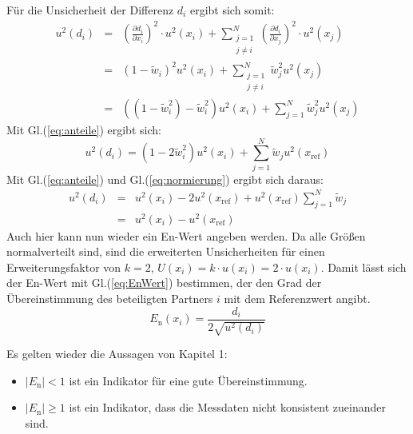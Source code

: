 \begin{itemize}
Für die Unsicherheit der Differenz $d_i$ ergibt sich somit:
\begin{eqnarray}
u^2(d_i) &=& \left( \frac{\partial d_i}{\partial x_i} \right)^2 \cdot u^2(x_i) +  \sum_{\substack{j=1 \\ j \neq i}}^{N}
\left( \frac{\partial d_i}{\partial x_j} \right)^2 \cdot u^2(x_j) \\
&=&  (1-\tilde w_i)^2 u^2(x_i) + \sum_{\substack{j=1 \\ j \neq i}}^{N} \tilde w_j^2 u^2( x_j) \\
&=& ((1-\tilde w_i^2)-\tilde w_i^2)u^2(x_i) + \sum_{j=1}^{N} \tilde w_j^2 u^2(x_j) 
\end{eqnarray}
Mit Gl.(\ref{eq:anteile}) ergibt sich:
\begin{equation}
u^2(d_i) = (1-2\tilde w_i^2)u^2(x_i) + \sum_{j=1}^{N} \tilde w_j u^2(x_\mathrm{ref}) 
\end{equation}
Mit Gl.(\ref{eq:anteile}) und Gl.(\ref{eq:normierung}) ergibt sich daraus:
\begin{eqnarray}
u^2(d_i) &=& u^2(x_i) - 2u^2(x_\mathrm{ref}) + u^2(x_\mathrm{ref}) \sum_{j=1}^{N}\tilde w_j  
\nonumber \\
  &=& u^2(x_i) -u^2(x_\mathrm{ref})
\end{eqnarray}
Auch hier kann nun wieder ein En-Wert angeben werden. Da alle Größen normalverteilt sind, sind die erweiterten Unsicherheiten für einen 
Erweiterungsfaktor von $k=2$, $U(x_i) = k \cdot u(x_i) =2 \cdot u(x_i)$. Damit lässt sich der En-Wert mit Gl.(\ref{eq:EnWert}) bestimmen, der den
Grad der Übereinstimmung des beteiligten Partners $i$ mit dem Referenzwert
angibt.
\begin{equation}
E_\mathrm{n}(x_i) = \frac{d_i}{2\sqrt{u^2(d_i)}}
\end{equation}
\end{itemize}

Es gelten wieder die Aussagen von Kapitel 1:
\begin{itemize}
	\item $|E_\mathrm{n}| < 1$ ist ein Indikator für eine gute Übereinstimmung.
	\item $|E_\mathrm{n}| \ge 1 $ ist ein Indikator, dass die Messdaten nicht konsistent zueinander sind.
\end{itemize} 
